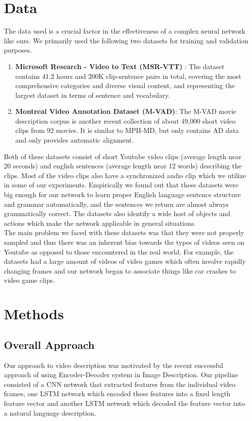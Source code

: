 \documentclass[12pt]{article}
\begin{document}
	\section{Data}
The data used is a crucial factor in the effectiveness of a complex neural network like ours. We primarily used the following two datasets for training and validation purposes.
	\begin{enumerate}
		\item
			\textbf{Microsoft Research - Video to Text (MSR-VTT)} \cite{msrvtt}: The dataset contains 41.2 hours and 200K clip-sentence pairs in total, covering the most comprehensive categories and diverse visual content, and representing the largest dataset in terms of sentence and vocabulary.
		\item
			\textbf{Montreal Video Annotation Dataset (M-VAD)}: The M-VAD movie description corpus is another recent collection of about 49,000 short video clips from 92 movies. It is similar to MPII-MD, but only contains AD data and only provides automatic alignment.
		\end{enumerate}
		Both of these datasets consist of short Youtube video clips (average length near 20 seconds) and english sentences (average length near 12 words) describing the clips. Most of the video clips also have a synchronized audio clip which we utilize in some of our experiments. 
		Empirically we found out that these datasets were big enough for our network to learn proper English language sentence structure and grammar automatically, and the sentences we return are almost always grammatically correct. The datasets also identify a wide host of objects and actions which make the network applicable in general situations.\\
		The main problem we faced with these datasets was that they were not properly sampled and thus there was an inherent bias towards the types of videos seen on Youtube as opposed to those encountered in the real world. For example, the datasets had a large amount of videos of video games which often involve rapidly changing frames and our network began to associate things like car crashes to video game clips. 
\section{Methods}
\subsection{Overall Approach}
	Our approach to video description was motivated by the recent successful approach of using Encoder-Decoder system in Image Description.
	Our pipeline consisted of a CNN network that extracted features from the individual video frames, one LSTM network which encoded these features into a fixed length feature vector\cite{temporal} and another LSTM network which decoded the feature vector into a natural language description.
\end{document}

